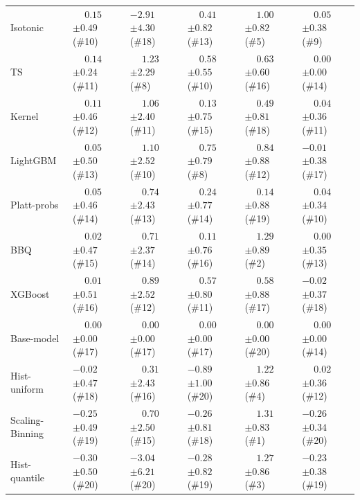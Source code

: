 \begin{tabular}{llllll}
Isotonic & $\phantom{-}0.15$ {\tiny $\pm 0.49$} (\#10) & $-2.91$ {\tiny $\pm 4.30$} (\#18) & $\phantom{-}0.41$ {\tiny $\pm 0.82$} (\#13) & $\phantom{-}1.00$ {\tiny $\pm 0.82$} (\#5) & $\phantom{-}0.05$ {\tiny $\pm 0.38$} (\#9) \\
TS & $\phantom{-}0.14$ {\tiny $\pm 0.24$} (\#11) & $\phantom{-}1.23$ {\tiny $\pm 2.29$} (\#8) & $\phantom{-}0.58$ {\tiny $\pm 0.55$} (\#10) & $\phantom{-}0.63$ {\tiny $\pm 0.60$} (\#16) & $\phantom{-}0.00$ {\tiny $\pm 0.00$} (\#14) \\
Kernel & $\phantom{-}0.11$ {\tiny $\pm 0.46$} (\#12) & $\phantom{-}1.06$ {\tiny $\pm 2.40$} (\#11) & $\phantom{-}0.13$ {\tiny $\pm 0.75$} (\#15) & $\phantom{-}0.49$ {\tiny $\pm 0.81$} (\#18) & $\phantom{-}0.04$ {\tiny $\pm 0.36$} (\#11) \\
LightGBM & $\phantom{-}0.05$ {\tiny $\pm 0.50$} (\#13) & $\phantom{-}1.10$ {\tiny $\pm 2.52$} (\#10) & $\phantom{-}0.75$ {\tiny $\pm 0.79$} (\#8) & $\phantom{-}0.84$ {\tiny $\pm 0.88$} (\#12) & $-0.01$ {\tiny $\pm 0.38$} (\#17) \\
Platt-probs & $\phantom{-}0.05$ {\tiny $\pm 0.46$} (\#14) & $\phantom{-}0.74$ {\tiny $\pm 2.43$} (\#13) & $\phantom{-}0.24$ {\tiny $\pm 0.77$} (\#14) & $\phantom{-}0.14$ {\tiny $\pm 0.88$} (\#19) & $\phantom{-}0.04$ {\tiny $\pm 0.34$} (\#10) \\
BBQ & $\phantom{-}0.02$ {\tiny $\pm 0.47$} (\#15) & $\phantom{-}0.71$ {\tiny $\pm 2.37$} (\#14) & $\phantom{-}0.11$ {\tiny $\pm 0.76$} (\#16) & $\phantom{-}1.29$ {\tiny $\pm 0.89$} (\#2) & $\phantom{-}0.00$ {\tiny $\pm 0.35$} (\#13) \\
XGBoost & $\phantom{-}0.01$ {\tiny $\pm 0.51$} (\#16) & $\phantom{-}0.89$ {\tiny $\pm 2.52$} (\#12) & $\phantom{-}0.57$ {\tiny $\pm 0.80$} (\#11) & $\phantom{-}0.58$ {\tiny $\pm 0.88$} (\#17) & $-0.02$ {\tiny $\pm 0.37$} (\#18) \\
Base-model & $\phantom{-}0.00$ {\tiny $\pm 0.00$} (\#17) & $\phantom{-}0.00$ {\tiny $\pm 0.00$} (\#17) & $\phantom{-}0.00$ {\tiny $\pm 0.00$} (\#17) & $\phantom{-}0.00$ {\tiny $\pm 0.00$} (\#20) & $\phantom{-}0.00$ {\tiny $\pm 0.00$} (\#14) \\
Hist-uniform & $-0.02$ {\tiny $\pm 0.47$} (\#18) & $\phantom{-}0.31$ {\tiny $\pm 2.43$} (\#16) & $-0.89$ {\tiny $\pm 1.00$} (\#20) & $\phantom{-}1.22$ {\tiny $\pm 0.86$} (\#4) & $\phantom{-}0.02$ {\tiny $\pm 0.36$} (\#12) \\
Scaling-Binning & $-0.25$ {\tiny $\pm 0.49$} (\#19) & $\phantom{-}0.70$ {\tiny $\pm 2.50$} (\#15) & $-0.26$ {\tiny $\pm 0.81$} (\#18) & $\phantom{-}1.31$ {\tiny $\pm 0.83$} (\#1) & $-0.26$ {\tiny $\pm 0.34$} (\#20) \\
Hist-quantile & $-0.30$ {\tiny $\pm 0.50$} (\#20) & $-3.04$ {\tiny $\pm 6.21$} (\#20) & $-0.28$ {\tiny $\pm 0.82$} (\#19) & $\phantom{-}1.27$ {\tiny $\pm 0.86$} (\#3) & $-0.23$ {\tiny $\pm 0.38$} (\#19) \\
\bottomrule
\end{tabular}
